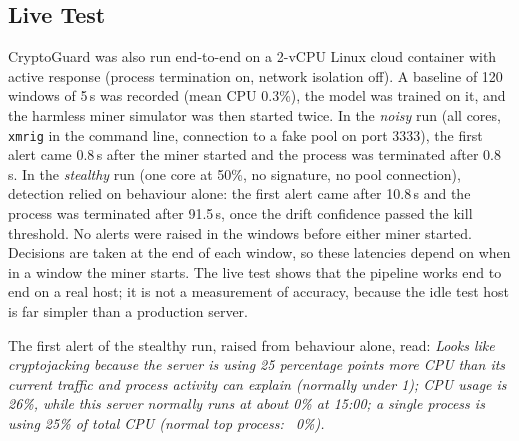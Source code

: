 \subsection{Live Test}
CryptoGuard was also run end-to-end on a 2-vCPU Linux cloud container with active response (process termination on, network isolation off). A baseline of 120 windows of 5\,s was recorded (mean CPU 0.3\%), the model was trained on it, and the harmless miner simulator was then started twice. In the \emph{noisy} run (all cores, \texttt{xmrig} in the command line, connection to a fake pool on port 3333), the first alert came 0.8\,s after the miner started and the process was terminated after 0.8\,s. In the \emph{stealthy} run (one core at 50\%, no signature, no pool connection), detection relied on behaviour alone: the first alert came after 10.8\,s and the process was terminated after 91.5\,s, once the drift confidence passed the kill threshold. No alerts were raised in the windows before either miner started. Decisions are taken at the end of each window, so these latencies depend on when in a window the miner starts. The live test shows that the pipeline works end to end on a real host; it is not a measurement of accuracy, because the idle test host is far simpler than a production server.

The first alert of the stealthy run, raised from behaviour alone, read: \emph{Looks like cryptojacking because the server is using 25 percentage points more CPU than its current traffic and process activity can explain (normally under 1); CPU usage is 26\%, while this server normally runs at about 0\% at 15:00; a single process is using 25\% of total CPU (normal top process: ~0\%).}
